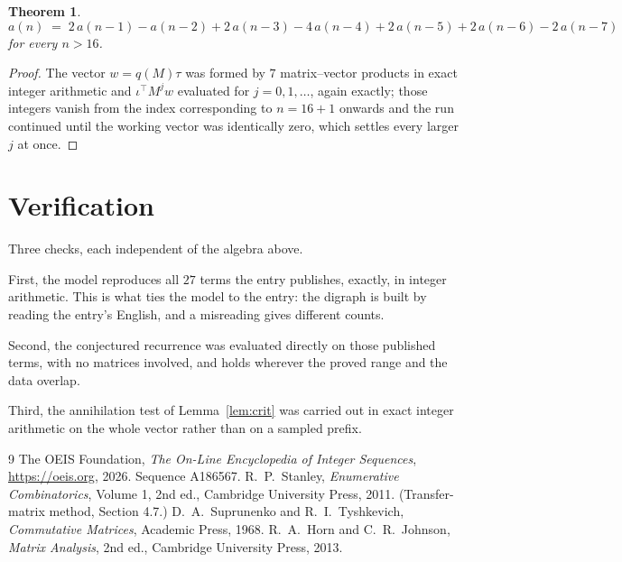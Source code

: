 \documentclass[11pt,a4paper]{article}
\theoremstyle{plain}
\newtheorem{theorem}{Theorem}
\theoremstyle{definition}
\begin{document}
\begin{theorem}
\[
a(n)\;=\;2\,a(n-1) - a(n-2) + 2\,a(n-3) - 4\,a(n-4) + 2\,a(n-5) + 2\,a(n-6) - 2\,a(n-7)
\]
for every $n>16$.
\end{theorem}

\begin{proof}
The vector $w=q(M)\tau$ was formed by $7$ matrix--vector products in exact integer
arithmetic and $\iota^{\!\top}M^{j}w$ evaluated for $j=0,1,\dots$, again exactly; those
integers vanish from the index corresponding to $n=16+1$ onwards and the run continued
until the working vector was identically zero, which settles every larger $j$ at once.
\end{proof}

\section{Verification}

Three checks, each independent of the algebra above.

First, the model reproduces all $27$ terms the entry publishes, exactly, in integer
arithmetic. This is what ties the model to the entry: the digraph is built by reading the
entry's English, and a misreading gives different counts.

Second, the conjectured recurrence was evaluated directly on those published terms, with no
matrices involved, and holds wherever the proved range and the data overlap.

Third, the annihilation test of Lemma~\ref{lem:crit} was carried out in exact integer
arithmetic on the whole vector rather than on a sampled prefix.

\begin{thebibliography}{9}
 The OEIS Foundation, \emph{The On-Line Encyclopedia of Integer
Sequences}, \url{https://oeis.org}, 2026. Sequence A186567.
 R.~P.~Stanley, \emph{Enumerative Combinatorics}, Volume 1, 2nd ed.,
Cambridge University Press, 2011. (Transfer-matrix method, Section 4.7.)
 D.~A.~Suprunenko and R.~I.~Tyshkevich, \emph{Commutative Matrices},
Academic Press, 1968.
 R.~A.~Horn and C.~R.~Johnson, \emph{Matrix Analysis}, 2nd ed., Cambridge
University Press, 2013.
\end{thebibliography}
\end{document}
